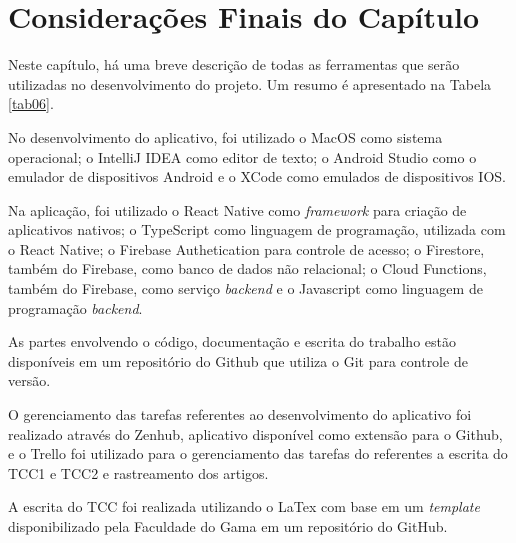 \section{Considerações Finais do Capítulo}


Neste capítulo, há uma breve descrição de todas as ferramentas que serão 
utilizadas no desenvolvimento do projeto. Um resumo é apresentado na Tabela \ref{tab06}.

No desenvolvimento do aplicativo, foi utilizado o MacOS como sistema 
operacional; o IntelliJ IDEA como editor de texto; o Android Studio como 
o emulador de dispositivos Android e o XCode como emulados de dispositivos IOS. 

Na aplicação, foi utilizado o React Native 
como \emph{framework} para criação de aplicativos nativos; o TypeScript como linguagem 
de programação, utilizada com o React Native; o Firebase Authetication para controle de acesso; 
o Firestore, também do Firebase, como banco de dados não relacional; o Cloud Functions, também do Firebase,
como serviço \emph{backend} e o Javascript 
como linguagem de programação \emph{backend}.

As partes envolvendo o código, documentação e escrita do trabalho estão disponíveis 
em um repositório do Github que utiliza o Git para controle de versão.

O gerenciamento das tarefas referentes ao desenvolvimento do aplicativo foi realizado através do Zenhub, 
aplicativo disponível como extensão para o Github, 
e o Trello foi utilizado para o gerenciamento das tarefas do referentes a escrita do TCC1 e TCC2 e 
rastreamento dos artigos. 

A escrita do TCC foi realizada utilizando o LaTex com base em um \emph{template} 
disponibilizado pela Faculdade do Gama em um repositório do GitHub. 


